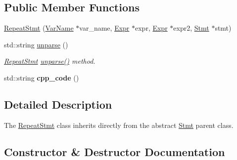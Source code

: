 \subsection*{Public Member Functions}
\begin{DoxyCompactItemize}
\item 
\hyperlink{classfcal_1_1ast_1_1RepeatStmt_a34c549b6cca266656e0b32e8efba5677}{Repeat\+Stmt} (\hyperlink{classfcal_1_1ast_1_1VarName}{Var\+Name} $\ast$var\+\_\+name, \hyperlink{classfcal_1_1ast_1_1Expr}{Expr} $\ast$expr, \hyperlink{classfcal_1_1ast_1_1Expr}{Expr} $\ast$expr2, \hyperlink{classfcal_1_1ast_1_1Stmt}{Stmt} $\ast$stmt)
\item 
std\+::string \hyperlink{classfcal_1_1ast_1_1RepeatStmt_a29fc58ac93a3b92cb2d5e83047f94fb6}{unparse} ()
\begin{DoxyCompactList}\small\item\em \hyperlink{classfcal_1_1ast_1_1RepeatStmt}{Repeat\+Stmt} \hyperlink{classfcal_1_1ast_1_1RepeatStmt_a29fc58ac93a3b92cb2d5e83047f94fb6}{unparse()} method. \end{DoxyCompactList}\item 
std\+::string {\bfseries cpp\+\_\+code} ()\hypertarget{classfcal_1_1ast_1_1RepeatStmt_aa30d4cdb1940b9201784021da8f9b058}{}\label{classfcal_1_1ast_1_1RepeatStmt_aa30d4cdb1940b9201784021da8f9b058}

\end{DoxyCompactItemize}


\subsection{Detailed Description}
The \hyperlink{classfcal_1_1ast_1_1RepeatStmt}{Repeat\+Stmt} class inherits directly from the abstract \hyperlink{classfcal_1_1ast_1_1Stmt}{Stmt} parent class. 

\subsection{Constructor \& Destructor Documentation}
